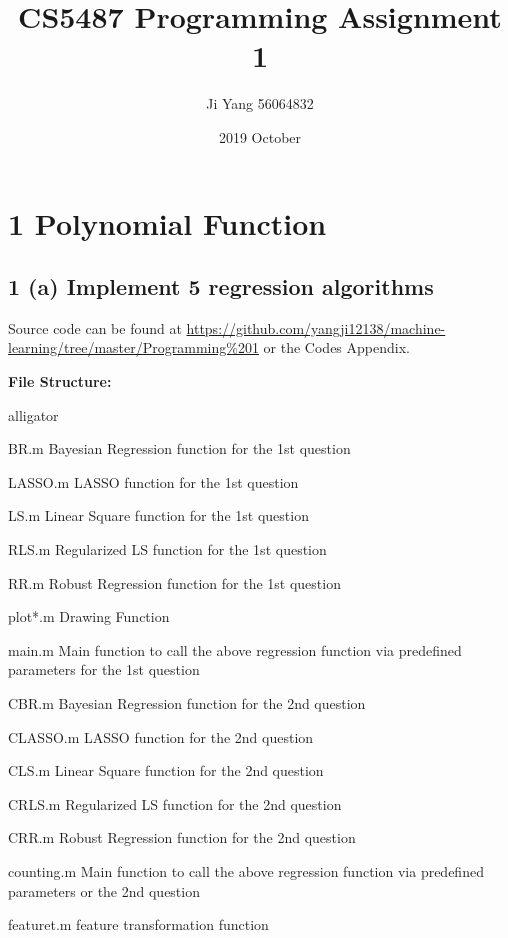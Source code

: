 \documentclass{article}
\title{CS5487 Programming Assignment 1}
\date{2019 October}
\author{Ji Yang 56064832}
\begin{document}
\maketitle


\section*{1 Polynomial Function}
\subsection*{1 (a) Implement 5 regression algorithms}
Source code can be found at \url{https://github.com/yangji12138/machine-learning/tree/master/Programming%201} or the Codes Appendix.

\vspace{1em}
\noindent\textbf{File Structure:}

\begin{labeling}{alligator}
\item [BR.m] Bayesian Regression function for the 1st question
\item [LASSO.m] LASSO function for the 1st question
\item [LS.m] Linear Square function for the 1st question
\item [RLS.m] Regularized LS function for the 1st question
\item [RR.m] Robust Regression function for the 1st question
\item [plot*.m] Drawing Function
\item [main.m] Main function to call the above regression function via predefined parameters for the 1st question
\item [CBR.m] Bayesian Regression function for the 2nd question
\item [CLASSO.m] LASSO function for the 2nd question
\item [CLS.m] Linear Square function for the 2nd question
\item [CRLS.m] Regularized LS function for the 2nd question
\item [CRR.m] Robust Regression function for the 2nd question
\item [counting.m] Main function to call the above regression function via predefined parameters or the 2nd question
\item [featuret.m] feature transformation function
\end{labeling}
\end{document}
